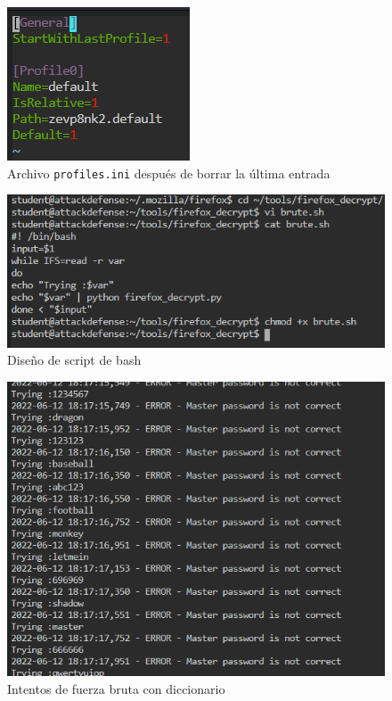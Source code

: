 \documentclass{article}
\begin{document}
        \begin{figure}[!h]
            \centering
            \includegraphics[scale=0.7]{img/profiles-after.png}
            \caption{Archivo \texttt{profiles.ini} después de borrar la última entrada}
            \label{fig:profiles-after}
        \end{figure}

        \clearpage
        \begin{figure}[!h]
            \centering
            \includegraphics[scale=0.7]{img/bash-vim.png}
            \caption{Diseño de script de bash}
            \label{fig:bash-vim}
        \end{figure}

        \begin{figure}[!h]
            \centering
            \includegraphics[scale=0.7]{img/brute-attempts.png}
            \caption{Intentos de fuerza bruta con diccionario}
            \label{fig:brute-attempts}
        \end{figure}
        
\end{document}
